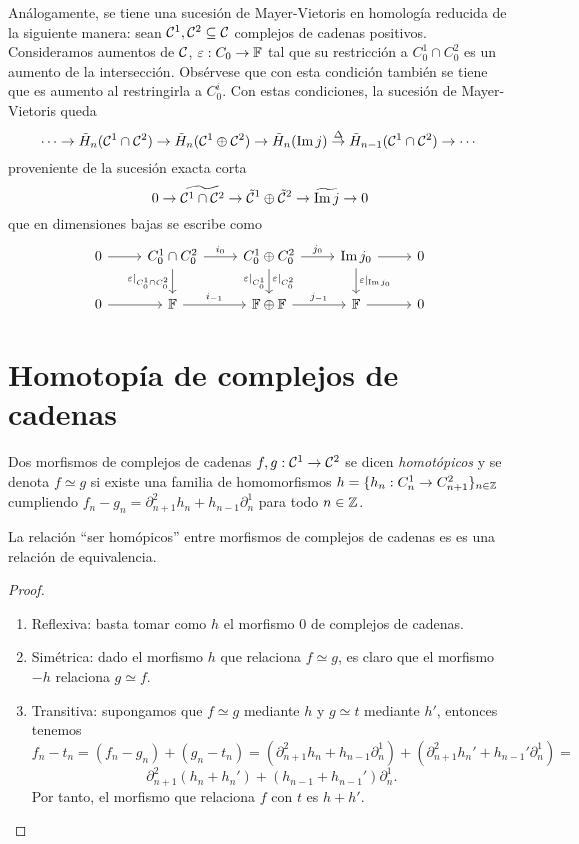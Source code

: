 \documentclass[HS.tex]{subfiles}
\begin{document}
Análogamente, se tiene una sucesión de Mayer-Vietoris en homología reducida de la siguiente manera: sean $\mathcal{C}^1,\mathcal{C}^2\subseteq\mathcal{C}$ complejos de cadenas positivos. Consideramos aumentos de $\mathcal{C}$, $\varepsilon:C_0\to\mathbb{F}$ tal que su restricción a $C_0^1\cap C_0^2$ es un aumento de la intersección. Obsérvese que con esta condición también se tiene que es aumento al restringirla a $C_0^i$. Con estas condiciones, la sucesión de Mayer-Vietoris queda
\[
\cdots\to \tilde{H}_n(\mathcal{C}^1\cap\mathcal{C}^2)\to\tilde{H}_n(\mathcal{C}^1\oplus\mathcal{C}^2)\to\tilde{H}_n(\operatorname{Im}{j})\overset{\Delta}{\to}\tilde{H}_{n-1}(\mathcal{C}^1\cap\mathcal{C}^2)\to\cdots
\]
proveniente de la sucesión exacta corta 
\[
0\to \widetilde{\mathcal{C}^1\cap \mathcal{C}^2}\to \tilde{\mathcal{C}}^1\oplus\tilde{\mathcal{C}}^2\to\widetilde{\operatorname{Im}{j}}\to 0
\]
que en dimensiones bajas se escribe como
\[
\begin{tikzcd}
0\arrow[r] & C_0^1\cap C_0^2\arrow[r,"i_0"]\arrow[d, "\varepsilon|_{C_0^1\cap C_0^2}"'] & C_0^1\oplus C_0^2\arrow[r,"j_0"]\arrow[d, "\varepsilon|_{C_0^1}"', "\varepsilon|_{C_0^2}"] & \Ima{j_0}\arrow[r]\arrow[d, "\varepsilon|_{\Ima{j_0}}"] & 0\\
0\arrow[r] & \F\arrow[r,"i_{-1}"]& \F\oplus\F\arrow[r, "j_{-1}"] & \F\arrow[r] & 0 
\end{tikzcd}
\]

\section{Homotopía de complejos de cadenas}

\begin{defi}
Dos morfismos de complejos de cadenas $f,g:\mathcal{C}^1\to\mathcal{C}^2$ se dicen \emph{homotópicos} y se denota $f\simeq g$ si existe una familia de homomorfismos $h=\{h_n:C^1_n\to C^2_{n+1}\}_{n\in\mathbb{Z}}$ cumpliendo $f_n-g_n=\partial^2_{n+1}h_n+h_{n-1}\partial^1_n$ para todo $n\in\mathbb{Z}$.
\end{defi}

\begin{lemma}
La relación ``ser homópicos'' entre morfismos de complejos de cadenas es es una relación de equivalencia.
\end{lemma}
\begin{proof}\
\begin{enumerate}
\item Reflexiva: basta tomar como $h$ el morfismo 0 de complejos de cadenas.
\item Simétrica: dado el morfismo $h$ que relaciona $f\simeq g$, es claro que el morfismo $-h$ relaciona $g\simeq f$.
\item Transitiva: supongamos que $f\simeq g$ mediante $h$ y $g\simeq t$ mediante $h'$, entonces tenemos
\[
f_n-t_n=(f_n-g_n)+(g_n-t_n)=(\partial_{n+1}^2 h_n+h_{n-1}\partial_n^1)+(\partial_{n+1}^2 h_n'+h_{n-1}'\partial_n^1)=
\]
\[
\partial_{n+1}^2(h_n+h_n')+(h_{n-1}+h_{n-1}')\partial_n^1.
\]
Por tanto, el morfismo que relaciona $f$ con $t$ es $h+h'$. 
\end{enumerate}
\end{proof}
\end{document}
